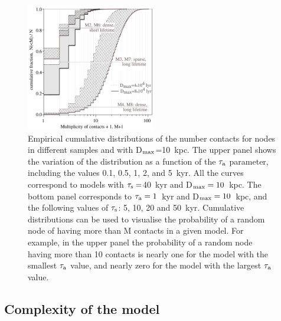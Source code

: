 \documentclass[crop]{CSLB}
\newcommand{\cetis}{nodes}
\begin{document}
 
\begin{figure} \centering
   \includegraphics[width=0.5\textwidth]{F_number_of_contacts.pdf}
   \caption{
    Empirical cumulative distributions of the number contacts
   for \cetis{} in different samples and with D$_{\rm max}$=10~kpc.
   The upper panel shows the variation of the distribution
   as a function of the $\tau_{\rm a}$ parameter, including the values 
   0.1, 0.5, 1, 2, and 5~kyr. All the curves
   correspond to models with 
   $\tau_{\rm s}=$40~kyr and \mbox{D$_{\rm max}=10$~kpc}.
   The bottom panel corresponds to 
   $\tau_{\rm a}=1$~kyr and D$_{\rm max}=10$~kpc, and the following values
   of $\tau_{\rm s}$: 5, 10, 20 and 50~kyr.
   Cumulative distributions can be used to visualise the probability
   of a random node of having more than M contacts in a given model.  For
   example, in the upper panel the probability of a random node having
   more than 10 contacts is nearly one for the model with the
   smallest $\tau_{\rm a}$ value, and nearly zero for the model with the
   largest $\tau_{\rm a}$ value.
   } \label{F_number_of_contacts}
\end{figure}
        
 

\subsection{Complexity of the model}
\end{document}
